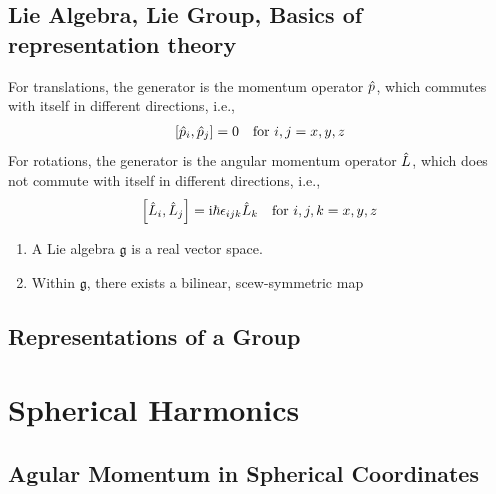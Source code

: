 \section{Lie Algebra, Lie Group, Basics of representation theory}
For translations, the generator is the momentum operator $\hat{p}$, which commutes with itself in different directions, i.e.,
\begin{align}
    \left[ \hat{p}_i , \hat{p}_j \right] = 0 \quad \text{for } i,j = x,y,z
\end{align}
For rotations, the generator is the angular momentum operator $\hat{L}$, which does not commute with itself in different directions, i.e.,
\begin{align}
    \left[ \hat{L}_i , \hat{L}_j \right] = \mathrm{i} \hbar \epsilon_{ijk} \hat{L}_k \quad \text{for } i,j,k = x,y,z
\end{align}
\begin{definition}
    \begin{enumerate}
        \item A Lie algebra $\mathfrak{g}$ is a real vector space. 
        \item Within $\mathfrak{g}$, there exists a bilinear, scew-symmetric map 
    \end{enumerate}
\end{definition}



\section{Representations of a Group} \label{sec:GroupRepresentations}






\chapter{Spherical Harmonics}

\section{Agular Momentum in Spherical Coordinates}

